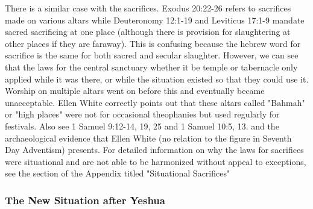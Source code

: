 \documentclass[11pt]{article}
\begin{document}
There is a similar case with the sacrifices. Exodus 20:22-26 refers to sacrifices made on various altars while Deuteronomy 12:1-19 and Leviticus 17:1-9 mandate sacred sacrificing at one place (although there is provision for slaughtering at other places if they are faraway). This is confusing because the hebrew word for sacrifice is the same for both sacred and secular slaughter. \cite{slaughter and sacrifice} However, we can see that the laws for the central sanctuary whether it be temple or tabernacle only applied while it was there, or while the situation existed so that they could use it. Worship on multiple altars went on before this and eventually became unacceptable. Ellen White correctly points out that these altars called "Bahmah" or "high places" were not for occasional theophanies but used regularly for festivals. Also see 1 Samuel 9:12-14, 19, 25 and 1 Samuel 10:5, 13. and the archaeological evidence that Ellen White (no relation to the figure in Seventh Day Adventism) presents. \cite{ellen white} 
For detailed information on why the laws for sacrifices were situational and are not able to be harmonized without appeal to exceptions, see the section of the Appendix titled "Situational Sacrifices"

\subsubsection{The New Situation after Yeshua}
\end{document}
